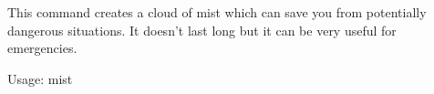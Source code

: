 This command creates a cloud of mist which can save you from potentially
dangerous situations. It doesn't last long but it can be very useful for
emergencies.

Usage: mist
 
